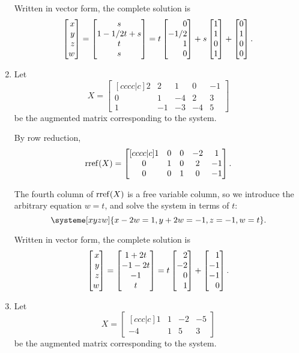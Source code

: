 \begin{exercises}
\begin{problist}
\begin{solution}
\begin{enumerate}
				Written in vector form, the complete solution is
				\[
					\mat{x\\y\\z\\w} = \matc{s\\1-1/2t+s\\t\\s}
					=t\mat{0\\-1/2\\1\\0}+s\mat{1\\1\\0\\1}+\mat{0\\1\\0\\0}.
				\]
				\item 
				Let
				\[
					X=
					\begin{bmatrix}[cccc|c]
						2 & 2 & 1 & 0 & -1\\
						0 & 1 & -4 & 2 & 3\\
						1 & -1 & -3 & -4 & 5
					\end{bmatrix}
				\]
				be the augmented matrix corresponding to the system.
				
				By row reduction,
				\[
					\operatorname{rref}(X)=
					\begin{bmatrix}[cccc|c]
						1 & 0 & 0 & -2 & 1\\
						0 & 1 & 0 & 2 & -1\\
						0 & 0 & 1 & 0 & -1
					\end{bmatrix}.
				\]
				
				The fourth column of $\operatorname{rref}(X)$ is a free variable column,
				so we introduce the arbitrary equation $w=t$, and solve the system
				in terms of $t$:
				\[
					\systeme[xyzw]{x-2w=1,y+2w=-1,z=-1,w=t}.
				\]
				
				Written in vector form, the complete solution is
				\[
				\mat{x\\y\\z\\w} = \matc{1+2t\\-1-2t\\-1\\t} = t\mat{2\\-2\\0\\1}+\mat{1\\-1\\-1\\0}.
				\]
				\item 
				Let
				\[
					X=
					\begin{bmatrix}[ccc|c]
						1 & 1 & -2 & -5\\
						-4 & 1 & 5 & 3
					\end{bmatrix}
				\]
				be the augmented matrix corresponding to the system.
				

\end{enumerate}
\end{solution}
\end{problist}
\end{exercises}

